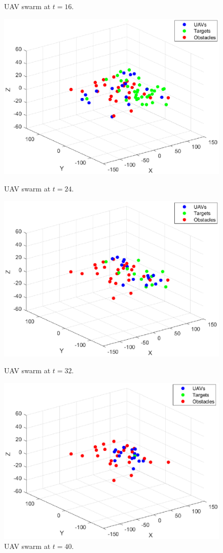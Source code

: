 \documentclass[a4paper,12pt]{report}
\begin{document}
\begin{figure}[H]
  \caption{UAV swarm at $t = 16$.}
    \endminipage\hfill
  \includegraphics[width=\linewidth]{uav120.eps}
  \caption{UAV swarm at $t = 24$.}
    \endminipage\hfill
  \includegraphics[width=\linewidth]{uav160.eps}
  \caption{UAV swarm at $t = 32$.}
    \endminipage\hfill
  \includegraphics[width=\linewidth]{uav200.eps}
  \caption{UAV swarm at $t = 40$.}
    \endminipage
\end{figure}
\end{document}
